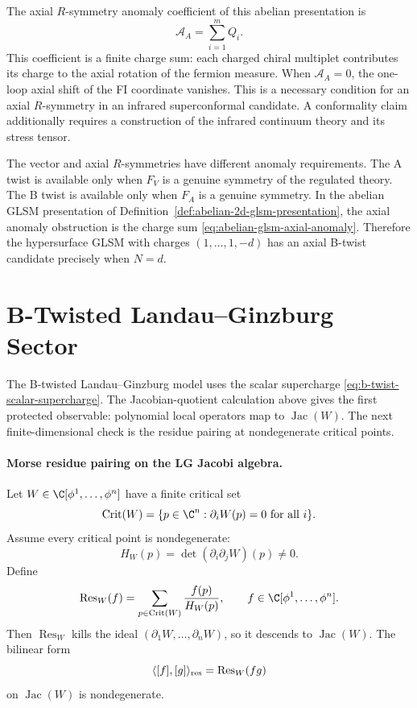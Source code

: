 The axial \(R\)-symmetry anomaly coefficient of this abelian presentation is
\begin{equation}
  \mathcal A_A=\sum_{i=1}^m Q_i.
  \label{eq:abelian-glsm-axial-anomaly}
\end{equation}
This coefficient is a finite charge sum: each charged chiral multiplet
contributes its charge to the axial rotation of the fermion measure.  When
\(\mathcal A_A=0\), the one-loop axial shift of the FI coordinate vanishes.
This is a necessary condition for an axial \(R\)-symmetry in an infrared
superconformal candidate.  A conformality claim additionally requires a
construction of the infrared continuum theory and its stress tensor.

The vector and axial \(R\)-symmetries have different anomaly requirements.
The A twist is available only when \(F_V\) is a genuine symmetry of the
regulated theory.  The B twist is available only when \(F_A\) is a genuine
symmetry.  In the abelian GLSM presentation of
Definition~\ref{def:abelian-2d-glsm-presentation}, the axial anomaly obstruction is
the charge sum \eqref{eq:abelian-glsm-axial-anomaly}.  Therefore the
hypersurface GLSM with charges \((1,\ldots,1,-d)\) has an axial B-twist
candidate precisely when \(N=d\).

\section{B-Twisted Landau--Ginzburg Sector}

The B-twisted Landau--Ginzburg model uses the scalar supercharge
\eqref{eq:b-twist-scalar-supercharge}.  The Jacobian-quotient calculation
above gives the first
protected observable: polynomial local operators map to
\(\operatorname{Jac}(W)\).  The next finite-dimensional check is the residue
pairing at nondegenerate critical points.

\paragraph{Morse residue pairing on the LG Jacobi algebra.}
Let \(W\in\C[\phi^1,\ldots,\phi^n]\) have a finite critical set
\[
  \operatorname{Crit}(W)=\{p\in\C^n:\partial_iW(p)=0
  \text{ for all }i\}.
\]
Assume every critical point is nondegenerate:
\[
  H_W(p)=\det(\partial_i\partial_jW)(p)\neq0 .
\]
Define
\begin{equation}
  \operatorname{Res}_W(f)
  =
  \sum_{p\in\operatorname{Crit}(W)}
  \frac{f(p)}{H_W(p)},
  \qquad f\in\C[\phi^1,\ldots,\phi^n].
  \label{eq:lg-morse-residue-functional}
\end{equation}
Then \(\operatorname{Res}_W\) kills the ideal
\((\partial_1W,\ldots,\partial_nW)\), so it descends to
\(\operatorname{Jac}(W)\).  The bilinear form
\begin{equation}
  \langle [f],[g]\rangle_{\rm res}
  =
  \operatorname{Res}_W(fg)
  \label{eq:lg-morse-residue-pairing}
\end{equation}
on \(\operatorname{Jac}(W)\) is nondegenerate.

